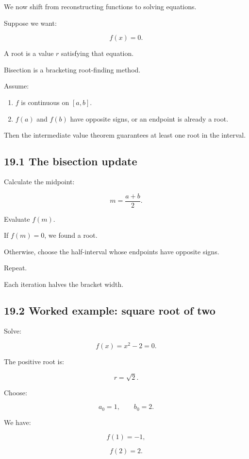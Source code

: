 We now shift from reconstructing functions to solving equations.

Suppose we want:

\[ \boxed{f(x)=0}. \]

A root is a value \(r\) satisfying that equation.

Bisection is a bracketing root-finding method.

Assume:

\begin{enumerate}
\def\labelenumi{\arabic{enumi}.}
\tightlist
\item
  \(f\) is continuous on \([a,b]\).
\item
  \(f(a)\) and \(f(b)\) have opposite signs, or an endpoint is already a root.
\end{enumerate}

Then the intermediate value theorem guarantees at least one root in the interval.

\subsection{19.1 The bisection update}\label{02-foundations-ii-ch028-the-bisection-update}

Calculate the midpoint:

\[ \boxed{ m=\frac{a+b}{2} }. \]

Evaluate \(f(m)\).

If \(f(m)=0\), we found a root.

Otherwise, choose the half-interval whose endpoints have opposite signs.

Repeat.

Each iteration halves the bracket width.

\subsection{19.2 Worked example: square root of two}\label{02-foundations-ii-ch028-worked-example-square-root-of-two}

Solve:

\[ f(x)=x^2-2=0. \]

The positive root is:

\[ r=\sqrt2. \]

Choose:

\[ a_0=1,\qquad b_0=2. \]

We have:

\[ f(1)=-1, \]

\[ f(2)=2. \]

